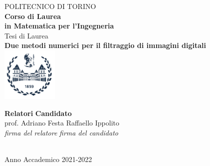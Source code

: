 \begin{titlepage}

\begin{center}

{\huge POLITECNICO DI TORINO}\\[1.5cm]
\textbf{Corso di Laurea\\in Matematica per l'Ingegneria}\\[3cm]

{\Large Tesi di Laurea}\\[1cm]
\textbf{\LARGE Due metodi numerici per il filtraggio di immagini digitali }\\[2cm]
\includegraphics[width=0.2\textwidth]{./Pictures/logo_polito_2021.jpg}
\vspace{4cm}


\begin{minipage}{0.85\textwidth}
\begin{flushleft}\large
\textbf{Relatori} \hfill \textbf{Candidato}\\
prof. Adriano Festa \hfill Raffaello Ippolito\\
\textit{firma del relatore} \hfill \textit{firma del candidato}\\[0.35cm]
\fillin\ \hfill \fillin
\end{flushleft}
\end{minipage}

\vfill

Anno Accademico 2021-2022
\end{center}

\restoregeometry %

\end{titlepage}